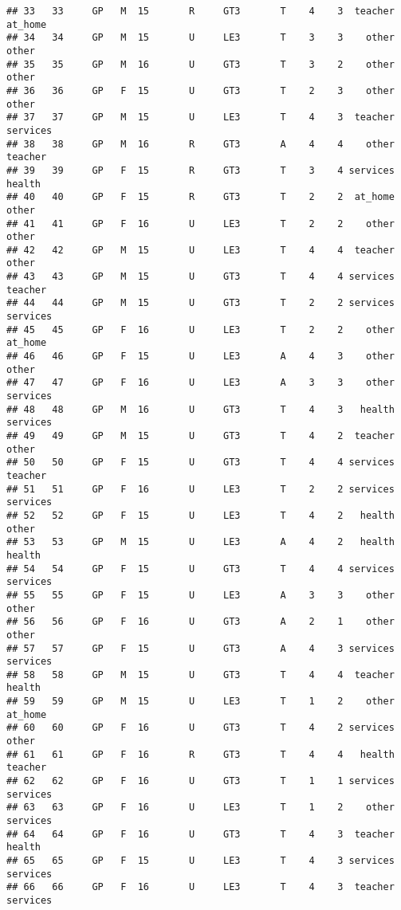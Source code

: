 \documentclass[]{article}
\begin{document}
\begin{verbatim}
## 33   33     GP   M  15       R     GT3       T    4    3  teacher  at_home
## 34   34     GP   M  15       U     LE3       T    3    3    other    other
## 35   35     GP   M  16       U     GT3       T    3    2    other    other
## 36   36     GP   F  15       U     GT3       T    2    3    other    other
## 37   37     GP   M  15       U     LE3       T    4    3  teacher services
## 38   38     GP   M  16       R     GT3       A    4    4    other  teacher
## 39   39     GP   F  15       R     GT3       T    3    4 services   health
## 40   40     GP   F  15       R     GT3       T    2    2  at_home    other
## 41   41     GP   F  16       U     LE3       T    2    2    other    other
## 42   42     GP   M  15       U     LE3       T    4    4  teacher    other
## 43   43     GP   M  15       U     GT3       T    4    4 services  teacher
## 44   44     GP   M  15       U     GT3       T    2    2 services services
## 45   45     GP   F  16       U     LE3       T    2    2    other  at_home
## 46   46     GP   F  15       U     LE3       A    4    3    other    other
## 47   47     GP   F  16       U     LE3       A    3    3    other services
## 48   48     GP   M  16       U     GT3       T    4    3   health services
## 49   49     GP   M  15       U     GT3       T    4    2  teacher    other
## 50   50     GP   F  15       U     GT3       T    4    4 services  teacher
## 51   51     GP   F  16       U     LE3       T    2    2 services services
## 52   52     GP   F  15       U     LE3       T    4    2   health    other
## 53   53     GP   M  15       U     LE3       A    4    2   health   health
## 54   54     GP   F  15       U     GT3       T    4    4 services services
## 55   55     GP   F  15       U     LE3       A    3    3    other    other
## 56   56     GP   F  16       U     GT3       A    2    1    other    other
## 57   57     GP   F  15       U     GT3       A    4    3 services services
## 58   58     GP   M  15       U     GT3       T    4    4  teacher   health
## 59   59     GP   M  15       U     LE3       T    1    2    other  at_home
## 60   60     GP   F  16       U     GT3       T    4    2 services    other
## 61   61     GP   F  16       R     GT3       T    4    4   health  teacher
## 62   62     GP   F  16       U     GT3       T    1    1 services services
## 63   63     GP   F  16       U     LE3       T    1    2    other services
## 64   64     GP   F  16       U     GT3       T    4    3  teacher   health
## 65   65     GP   F  15       U     LE3       T    4    3 services services
## 66   66     GP   F  16       U     LE3       T    4    3  teacher services

\end{verbatim}
\end{document}
